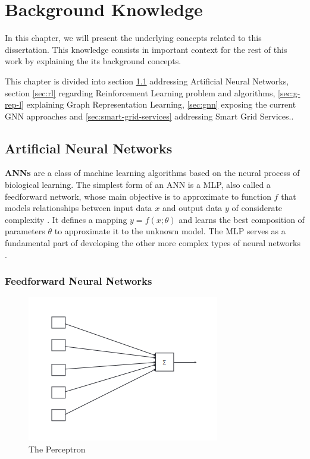 \chapter{Background Knowledge} \label{chap:background-knowledge}

In this chapter, we will present the underlying concepts related to this dissertation. This knowledge consists in important context for the rest of this work by explaining the its background concepts. \par
This chapter is divided into section \ref{sec:ann} addressing Artificial Neural Networks, section \ref{sec:rl} regarding Reinforcement Learning problem and algorithms, \ref{sec:g-rep-l} explaining Graph Representation Learning, \ref{sec:gnn} exposing the current \ac{GNN} approaches and \ref{sec:smart-grid-services} addressing Smart Grid Services..

\section{Artificial Neural Networks} \label{sec:ann}

\textbf{\acp{ANN}} are a class of machine learning algorithms based on the neural process of biological learning. The simplest form of an \ac{ANN} is a \ac{MLP}, also called a feedforward network, whose main objective is to approximate to function $f$ that models relationships between input data $x$ and output data $y$ of considerate complexity \cite{charniakIntroductionDeepLearning2018, goodfellowDeepLearning2016}. It defines a mapping $y=f(x;\theta)$ and learns the best composition of parameters $\theta$ to approximate it to the unknown model. The \ac{MLP} serves as a fundamental part of developing the other more complex types of neural networks \cite{charniakIntroductionDeepLearning2018}. \par

\subsection{Feedforward Neural Networks}

\begin{figure}
	\centering
	\includegraphics[width=0.50\linewidth]{./figures/perceptron.png}
	\caption{The Perceptron \cite{charniakIntroductionDeepLearning2018}}
	\label{fig:perceptron}
\end{figure}

